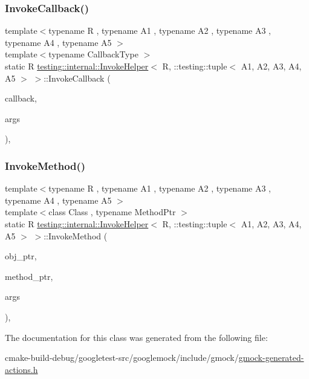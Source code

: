 \subsubsection{\texorpdfstring{InvokeCallback()}{InvokeCallback()}}
{\footnotesize\ttfamily template$<$typename R , typename A1 , typename A2 , typename A3 , typename A4 , typename A5 $>$ \\
template$<$typename Callback\+Type $>$ \\
static R \mbox{\hyperlink{classtesting_1_1internal_1_1InvokeHelper}{testing\+::internal\+::\+Invoke\+Helper}}$<$ R, \+::testing\+::tuple$<$ A1, A2, A3, A4, A5 $>$ $>$\+::Invoke\+Callback (\begin{DoxyParamCaption}\item[{Callback\+Type $\ast$}]{callback,  }\item[{const \+::testing\+::tuple$<$ A1, A2, A3, A4, A5 $>$ \&}]{args }\end{DoxyParamCaption})\hspace{0.3cm}{\ttfamily [inline]}, {\ttfamily [static]}}

\mbox{\label{classtesting_1_1internal_1_1InvokeHelper_3_01R_00_01_1_1testing_1_1tuple_3_01A1_00_01A2_00_01A3_00_01A4_00_01A5_01_4_01_4_a5748d33ebff032886c73d88f4b511d87}} 
\subsubsection{\texorpdfstring{InvokeMethod()}{InvokeMethod()}}
{\footnotesize\ttfamily template$<$typename R , typename A1 , typename A2 , typename A3 , typename A4 , typename A5 $>$ \\
template$<$class Class , typename Method\+Ptr $>$ \\
static R \mbox{\hyperlink{classtesting_1_1internal_1_1InvokeHelper}{testing\+::internal\+::\+Invoke\+Helper}}$<$ R, \+::testing\+::tuple$<$ A1, A2, A3, A4, A5 $>$ $>$\+::Invoke\+Method (\begin{DoxyParamCaption}\item[{Class $\ast$}]{obj\+\_\+ptr,  }\item[{Method\+Ptr}]{method\+\_\+ptr,  }\item[{const \+::testing\+::tuple$<$ A1, A2, A3, A4, A5 $>$ \&}]{args }\end{DoxyParamCaption})\hspace{0.3cm}{\ttfamily [inline]}, {\ttfamily [static]}}



The documentation for this class was generated from the following file\+:\begin{DoxyCompactItemize}
\item 
cmake-\/build-\/debug/googletest-\/src/googlemock/include/gmock/\mbox{\hyperlink{gmock-generated-actions_8h}{gmock-\/generated-\/actions.\+h}}\end{DoxyCompactItemize}
